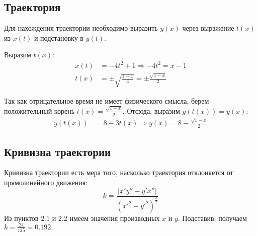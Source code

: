 \subsection{Траектория}
Для нахождения траектории необходимо выразить $y(x)$ через
выражение $t(x)$ из $x(t)$ и подстановку в $y(t)$.

Выразим $t(x)$:\\
\begin{align}
    x(t) &= -4t^{2} + 1 \Rightarrow -4t^{2} = x - 1 \\
    t(x) &= \pm\sqrt{\frac{1-x}{4}} = \pm\frac{\sqrt{1 - x}}{2}
\end{align}

Так как отрицательное время не имеет физического смысла, берем
положительный корень $t(x) = \frac{\sqrt{1 - x}}{2}$.
Отсюда, выразим $y(t(x)) = y(x)$:\\
\begin{align}
    y(t(x)) &= 8 - 3t(x) \Rightarrow
    y(x) = 8 - \frac{\sqrt{1 - x}}{2}
\end{align}

\begin{figure}[ht]
    \centering
\end{figure}

\subsection{Кривизна траектории}
Кривизна траектории есть мера того, насколько траектория отклоняется от
прямолинейного движения:
$$
k = \frac{\left|x'y'' - y'x''\right|}{(x'^{2}+y'^{2})^{\frac{3}{2}}}
$$
Из пунктов $2.1$ и $2.2$ имеем значения производных $x$ и $y$.
Подставив, получаем $k = \frac{24}{125} = 0.192$
